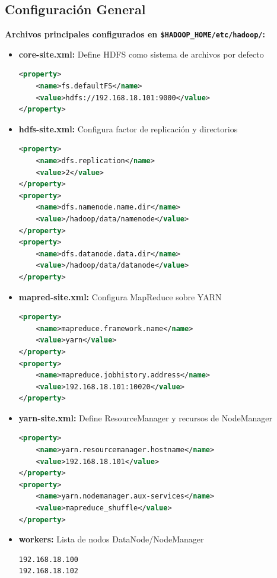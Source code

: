 \documentclass[12pt,a4paper]{article}
\begin{document}
\subsection{Configuración General}

\textbf{Archivos principales configurados en \texttt{\$HADOOP\_HOME/etc/hadoop/}:}

\begin{itemize}
    \item \textbf{core-site.xml:} Define HDFS como sistema de archivos por defecto
    \begin{lstlisting}[language=XML, basicstyle=\small\ttfamily]
<property>
    <name>fs.defaultFS</name>
    <value>hdfs://192.168.18.101:9000</value>
</property>
    \end{lstlisting}
    
    \item \textbf{hdfs-site.xml:} Configura factor de replicación y directorios
    \begin{lstlisting}[language=XML, basicstyle=\small\ttfamily]
<property>
    <name>dfs.replication</name>
    <value>2</value>
</property>
<property>
    <name>dfs.namenode.name.dir</name>
    <value>/hadoop/data/namenode</value>
</property>
<property>
    <name>dfs.datanode.data.dir</name>
    <value>/hadoop/data/datanode</value>
</property>
    \end{lstlisting}
    
    \item \textbf{mapred-site.xml:} Configura MapReduce sobre YARN
    \begin{lstlisting}[language=XML, basicstyle=\small\ttfamily]
<property>
    <name>mapreduce.framework.name</name>
    <value>yarn</value>
</property>
<property>
    <name>mapreduce.jobhistory.address</name>
    <value>192.168.18.101:10020</value>
</property>
    \end{lstlisting}
    
    \item \textbf{yarn-site.xml:} Define ResourceManager y recursos de NodeManager
    \begin{lstlisting}[language=XML, basicstyle=\small\ttfamily]
<property>
    <name>yarn.resourcemanager.hostname</name>
    <value>192.168.18.101</value>
</property>
<property>
    <name>yarn.nodemanager.aux-services</name>
    <value>mapreduce_shuffle</value>
</property>
    \end{lstlisting}
    
    \item \textbf{workers:} Lista de nodos DataNode/NodeManager
    \begin{lstlisting}[basicstyle=\small\ttfamily]
192.168.18.100
192.168.18.102
    \end{lstlisting}
\end{itemize}
\end{document}

